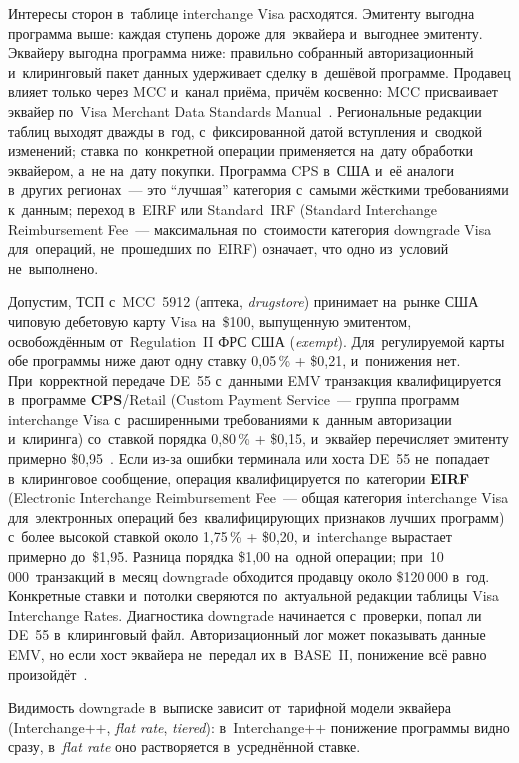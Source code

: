 Интересы сторон в~таблице interchange Visa расходятся. Эмитенту выгодна
программа выше: каждая ступень дороже для~эквайера и~выгоднее эмитенту.
Эквайеру выгодна программа ниже: правильно собранный авторизационный
и~клиринговый пакет данных удерживает сделку в~дешёвой программе. Продавец
влияет только через MCC и~канал приёма, причём косвенно: MCC присваивает
эквайер по~Visa Merchant Data Standards
Manual~\cite{visa-merchant-data-standards-manual}. Региональные редакции таблиц
выходят дважды в~год, с~фиксированной датой вступления и~сводкой изменений;
ставка по~конкретной операции применяется на~дату обработки эквайером, а~не
на~дату покупки. Программа CPS в~США и~её аналоги в~других регионах~--- это
\enquote{лучшая} категория с~самыми жёсткими требованиями к~данным; переход
в~EIRF или Standard~IRF (Standard Interchange Reimbursement Fee~---
  максимальная по~стоимости категория downgrade Visa для~операций, не~прошедших
по~EIRF) означает, что одно из~условий не~выполнено.

Допустим, ТСП с~MCC~5912 (аптека, \textit{drugstore}) принимает на~рынке США чиповую дебетовую
карту Visa на~\$100, выпущенную эмитентом, освобождённым от~Regulation~II
ФРС США (\textit{exempt}). Для~регулируемой карты обе программы ниже дают
одну ставку 0,05\,\% + \$0,21, и~понижения нет. При~корректной передаче DE~55 с~данными EMV транзакция
квалифицируется в~программе \textbf{CPS}\slash Retail (Custom Payment
  Service~--- группа программ interchange Visa с~расширенными требованиями
к~данным авторизации и~клиринга) со~ставкой порядка 0,80\,\% + \$0,15,
и~эквайер перечисляет эмитенту примерно \$0,95~\cite{visa-interchange}. Если
из-за ошибки терминала или хоста DE~55 не~попадает в~клиринговое сообщение,
операция квалифицируется по~категории \textbf{EIRF} (Electronic Interchange Reimbursement
  Fee~--- общая категория interchange Visa для~электронных операций
без~квалифицирующих признаков лучших программ) с~более высокой ставкой
около 1,75\,\% + \$0,20, и~interchange вырастает примерно до~\$1,95. Разница
порядка \$1,00 на~одной операции; при~10\,000~транзакций в~месяц downgrade
обходится продавцу около \$120\,000 в~год. Конкретные ставки и~потолки
сверяются по~актуальной редакции таблицы Visa Interchange Rates. Диагностика
downgrade начинается с~проверки, попал ли DE~55 в~клиринговый файл.
Авторизационный лог может показывать данные EMV, но если хост эквайера
не~передал их в~BASE~II, понижение всё равно
произойдёт~\cite{visa-core-rules,visa-tadg}.

Видимость down\-grade в~выписке зависит от~тарифной модели эквайера
(Inter\-change++, \textit{flat rate}, \textit{tiered}): в~Inter\-change++ понижение
программы видно сразу, в~\textit{flat rate} оно растворяется в~усреднённой
ставке.

